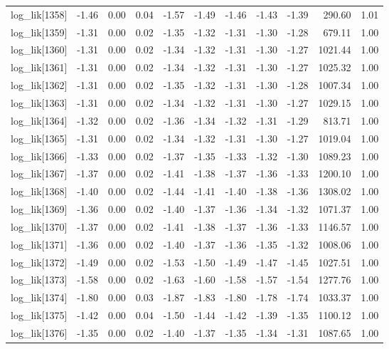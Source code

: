\begin{table}[ht]
\begin{tabular}{rrrrrrrrrrr}
  log\_lik[1358] & -1.46 & 0.00 & 0.04 & -1.57 & -1.49 & -1.46 & -1.43 & -1.39 & 290.60 & 1.01 \\ 
  log\_lik[1359] & -1.31 & 0.00 & 0.02 & -1.35 & -1.32 & -1.31 & -1.30 & -1.28 & 679.11 & 1.00 \\ 
  log\_lik[1360] & -1.31 & 0.00 & 0.02 & -1.34 & -1.32 & -1.31 & -1.30 & -1.27 & 1021.44 & 1.00 \\ 
  log\_lik[1361] & -1.31 & 0.00 & 0.02 & -1.34 & -1.32 & -1.31 & -1.30 & -1.27 & 1025.32 & 1.00 \\ 
  log\_lik[1362] & -1.31 & 0.00 & 0.02 & -1.35 & -1.32 & -1.31 & -1.30 & -1.28 & 1007.34 & 1.00 \\ 
  log\_lik[1363] & -1.31 & 0.00 & 0.02 & -1.34 & -1.32 & -1.31 & -1.30 & -1.27 & 1029.15 & 1.00 \\ 
  log\_lik[1364] & -1.32 & 0.00 & 0.02 & -1.36 & -1.34 & -1.32 & -1.31 & -1.29 & 813.71 & 1.00 \\ 
  log\_lik[1365] & -1.31 & 0.00 & 0.02 & -1.34 & -1.32 & -1.31 & -1.30 & -1.27 & 1019.04 & 1.00 \\ 
  log\_lik[1366] & -1.33 & 0.00 & 0.02 & -1.37 & -1.35 & -1.33 & -1.32 & -1.30 & 1089.23 & 1.00 \\ 
  log\_lik[1367] & -1.37 & 0.00 & 0.02 & -1.41 & -1.38 & -1.37 & -1.36 & -1.33 & 1200.10 & 1.00 \\ 
  log\_lik[1368] & -1.40 & 0.00 & 0.02 & -1.44 & -1.41 & -1.40 & -1.38 & -1.36 & 1308.02 & 1.00 \\ 
  log\_lik[1369] & -1.36 & 0.00 & 0.02 & -1.40 & -1.37 & -1.36 & -1.34 & -1.32 & 1071.37 & 1.00 \\ 
  log\_lik[1370] & -1.37 & 0.00 & 0.02 & -1.41 & -1.38 & -1.37 & -1.36 & -1.33 & 1146.57 & 1.00 \\ 
  log\_lik[1371] & -1.36 & 0.00 & 0.02 & -1.40 & -1.37 & -1.36 & -1.35 & -1.32 & 1008.06 & 1.00 \\ 
  log\_lik[1372] & -1.49 & 0.00 & 0.02 & -1.53 & -1.50 & -1.49 & -1.47 & -1.45 & 1027.51 & 1.00 \\ 
  log\_lik[1373] & -1.58 & 0.00 & 0.02 & -1.63 & -1.60 & -1.58 & -1.57 & -1.54 & 1277.76 & 1.00 \\ 
  log\_lik[1374] & -1.80 & 0.00 & 0.03 & -1.87 & -1.83 & -1.80 & -1.78 & -1.74 & 1033.37 & 1.00 \\ 
  log\_lik[1375] & -1.42 & 0.00 & 0.04 & -1.50 & -1.44 & -1.42 & -1.39 & -1.35 & 1100.12 & 1.00 \\ 
  log\_lik[1376] & -1.35 & 0.00 & 0.02 & -1.40 & -1.37 & -1.35 & -1.34 & -1.31 & 1087.65 & 1.00 \\ 

\end{tabular}
\end{table}
